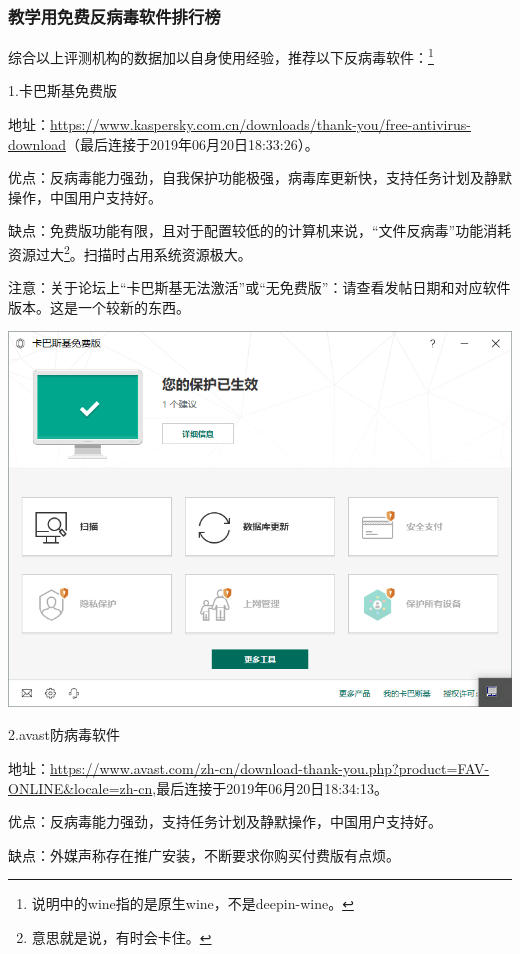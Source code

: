 \documentclass{book}
\begin{document}
\subsubsection{教学用免费反病毒软件排行榜}
综合以上评测机构的数据加以自身使用经验，推荐以下反病毒软件：\footnote{说明中的wine指的是原生wine，不是deepin-wine。}\par
1.卡巴斯基免费版\par
地址：\url{https://www.kaspersky.com.cn/downloads/thank-you/free-antivirus-download}（最后连接于2019年06月20日18:33:26）。\par
优点：反病毒能力强劲，自我保护功能极强，病毒库更新快，支持任务计划及静默操作，中国用户支持好。\par
缺点：免费版功能有限，且对于配置较低的的计算机来说，“文件反病毒”功能消耗资源过大\footnote{意思就是说，有时会卡住。}。扫描时占用系统资源极大。\par
注意：关于论坛上“卡巴斯基无法激活”或“无免费版”：请查看发帖日期和对应软件版本。这是一个较新的东西。
\begin{center}
	\includegraphics[scale=0.6]{pic/kfa}
\end{center}
2.avast防病毒软件\par
地址：\url{https://www.avast.com/zh-cn/download-thank-you.php?product=FAV-ONLINE\&locale=zh-cn},最后连接于2019年06月20日18:34:13。\par
优点：反病毒能力强劲，支持任务计划及静默操作，中国用户支持好。\par
缺点：外媒声称存在推广安装，不断要求你购买付费版有点烦。
\end{document}
